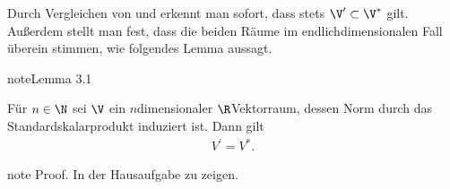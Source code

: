 \documentclass[letterpaper,10pt,english]{jupyterBook}
\begin{document}
\sphinxAtStartPar
Durch Vergleichen von {\hyperref[\detokenize{vektoranalysis/multilinear:def:algebraischerDualraum}]{}} und {\hyperref[\detokenize{vektoranalysis/multilinear:def:topologischerDualraum}]{}} erkennt man sofort, dass stets \(\V^\prime\subset \V^\ast\) gilt.
Außerdem stellt man fest, dass die beiden Räume im endlich\sphinxhyphen{}dimensionalen Fall überein stimmen, wie folgendes Lemma aussagt.
\label{vektoranalysis/multilinear:lemma-4}
\begin{sphinxadmonition}{note}{Lemma 3.1}



\sphinxAtStartPar
Für \(n\in\N\) sei \(\V\) ein \(n\)\sphinxhyphen{}dimensionaler \(\R\)\sphinxhyphen{}Vektorraum, dessen Norm durch das Standardskalarprodukt induziert ist.
Dann gilt
\begin{equation*}
\begin{split}V^\prime = V^\ast.\end{split}
\end{equation*}\end{sphinxadmonition}

\begin{sphinxadmonition}{note}
\sphinxAtStartPar
Proof. In der Hausaufgabe zu zeigen.
\end{sphinxadmonition}
\end{document}
